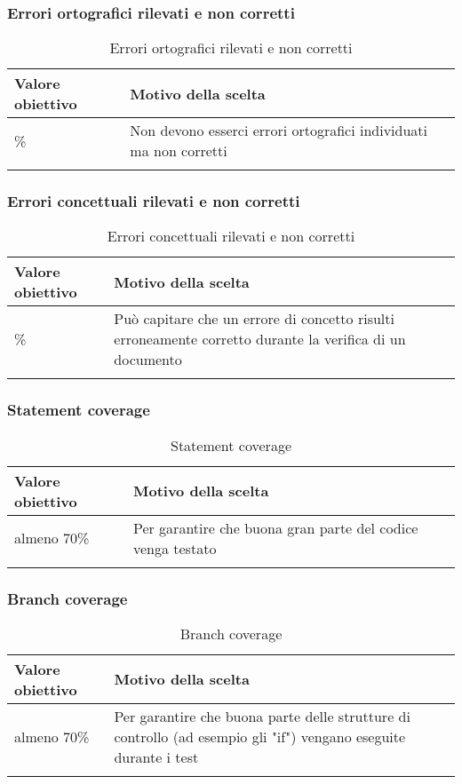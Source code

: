 \documentclass[../PianoDiQualifica.tex]{subfiles}
\begin{document}
		\subsubsection{Errori ortografici rilevati e non corretti}
			\begin{longtable}[c] { >{\centering\arraybackslash}p{4cm} p{7cm} }
				\toprule
				\centerline{\textbf{Valore obiettivo}} & \centerline{\textbf{Motivo della scelta}} \\
				\midrule
					0\% & Non devono esserci errori ortografici individuati ma non corretti \\
				\bottomrule
				\caption{Errori ortografici rilevati e non corretti}
			\end{longtable}
			
		\subsubsection{Errori concettuali rilevati e non corretti}
			\begin{longtable}[c] { >{\centering\arraybackslash}p{4cm} p{7cm} }
				\toprule
				\centerline{\textbf{Valore obiettivo}} & \centerline{\textbf{Motivo della scelta}} \\
				\midrule
					5\% & Può capitare che un errore di concetto risulti erroneamente corretto durante la verifica di un documento \\
				\bottomrule
				\caption{Errori concettuali rilevati e non corretti}
			\end{longtable}
			
		\subsubsection{Statement coverage}
			\begin{longtable}[c] { >{\centering\arraybackslash}p{4cm} p{7cm} }
				\toprule
				\centerline{\textbf{Valore obiettivo}} & \centerline{\textbf{Motivo della scelta}} \\
				\midrule
					almeno 70\% & Per garantire che buona gran parte del codice venga testato \\
				\bottomrule
				\caption{Statement coverage}
			\end{longtable}
			
		\subsubsection{Branch coverage}
			\begin{longtable}[c] { >{\centering\arraybackslash}p{4cm} p{7cm} }
				\toprule
				\centerline{\textbf{Valore obiettivo}} & \centerline{\textbf{Motivo della scelta}} \\
				\midrule
					almeno 70\% & Per garantire che buona parte delle strutture di controllo (ad esempio gli "if") vengano eseguite durante i test \\
				\bottomrule
				\caption{Branch coverage}
			\end{longtable}
\end{document}
